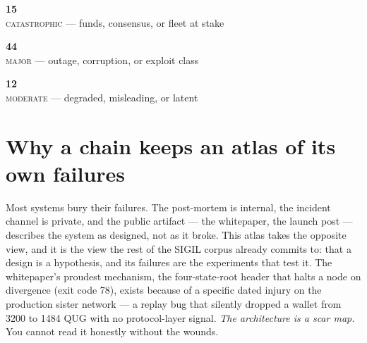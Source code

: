 \documentclass[10pt,a4paper]{article}
\begin{document}
\vspace{6pt}
\noindent
\begin{minipage}[t]{0.32\textwidth}\begin{tcolorbox}[colback=panelbg,colframe=slate,boxrule=0.5pt,arc=2pt,halign=center]
{\LARGE\bfseries\textcolor{sigilred}{15}}\\[2pt]{\scriptsize \textsc{catastrophic} — funds, consensus, or fleet at stake}\end{tcolorbox}\end{minipage}\hfill
\begin{minipage}[t]{0.32\textwidth}\begin{tcolorbox}[colback=panelbg,colframe=slate,boxrule=0.5pt,arc=2pt,halign=center]
{\LARGE\bfseries\textcolor{sigilamber}{44}}\\[2pt]{\scriptsize \textsc{major} — outage, corruption, or exploit class}\end{tcolorbox}\end{minipage}\hfill
\begin{minipage}[t]{0.32\textwidth}\begin{tcolorbox}[colback=panelbg,colframe=slate,boxrule=0.5pt,arc=2pt,halign=center]
{\LARGE\bfseries\textcolor{sigilblue}{12}}\\[2pt]{\scriptsize \textsc{moderate} — degraded, misleading, or latent}\end{tcolorbox}\end{minipage}

\vspace{10pt}

\section{Why a chain keeps an atlas of its own failures}

Most systems bury their failures. The post-mortem is internal, the incident channel is
private, and the public artifact — the whitepaper, the launch post — describes the system
as designed, not as it broke. This atlas takes the opposite view, and it is the view the
rest of the SIGIL corpus already commits to: that a design is a hypothesis, and its
failures are the experiments that test it. The whitepaper's proudest mechanism, the
four-state-root header that halts a node on divergence (exit code 78), exists because of
a specific dated injury on the production sister network — a replay bug that silently
dropped a wallet from 3200 to 1484 QUG with no protocol-layer signal. \emph{The
architecture is a scar map.} You cannot read it honestly without the wounds.
\end{document}
